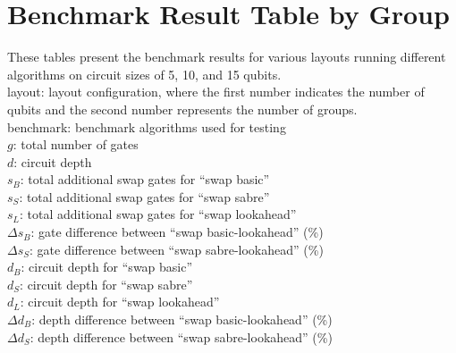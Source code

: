 \chapter{Benchmark Result Table by Group} \label{app:benchmark-result-table-by-group}
These tables present the benchmark results for various layouts running different algorithms on circuit sizes of 5, 10, and 15 qubits. \\
layout: layout configuration, where the first number indicates the number of qubits and the second number represents the number of groups. \\ benchmark: benchmark algorithms used for testing \\ $g$: total number of gates \\ $d$: circuit depth \\ $s_B$: total additional swap gates for ``swap basic'' \\ $s_S$: total additional swap gates for ``swap sabre'' \\ $s_L$: total additional swap gates for ``swap lookahead'' \\ $\Delta s_B$: gate difference between ``swap basic-lookahead'' (\%) \\ $\Delta s_S$: gate difference between ``swap sabre-lookahead'' (\%) \\ $d_B$: circuit depth for ``swap basic'' \\ $d_S$: circuit depth for ``swap sabre'' \\ $d_L$: circuit depth for ``swap lookahead'' \\ $\Delta d_B$: depth difference between ``swap basic-lookahead'' (\%) \\ $\Delta d_S$: depth difference between ``swap sabre-lookahead'' (\%) \\

% 
% 
% 